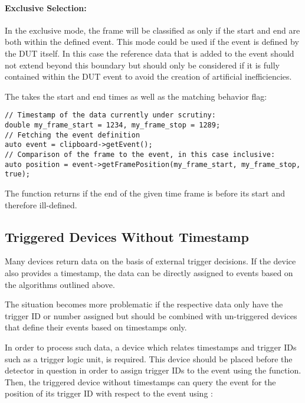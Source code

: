 \paragraph{Exclusive Selection:}
In the exclusive mode, the frame will be classified as  only if the start and end are both within the defined event.
This mode could be used if the event is defined by the DUT itself.
In this case the reference data that is added to the event should not extend beyond this boundary but should only be considered if it is fully contained within the DUT event to avoid the creation of artificial inefficiencies.

The  takes the start and end times as well as the matching behavior flag:

\begin{verbatim}
// Timestamp of the data currently under scrutiny:
double my_frame_start = 1234, my_frame_stop = 1289;
// Fetching the event definition
auto event = clipboard->getEvent();
// Comparison of the frame to the event, in this case inclusive:
auto position = event->getFramePosition(my_frame_start, my_frame_stop, true);
\end{verbatim}

The function returns  if the end of the given time frame is before its start and therefore ill-defined.

\subsection{Triggered Devices Without Timestamp}
\label{sec:triggered_devices}

Many devices return data on the basis of external trigger decisions.
If the device also provides a timestamp, the data can be directly assigned to events based on the algorithms outlined above.

The situation becomes more problematic if the respective data only have the trigger ID or number assigned but should be combined with un-triggered devices that define their events based on timestamps only.

In order to process such data, a device which relates timestamps and trigger IDs such as a trigger logic unit, is required.
This device should be placed before the detector in question in order to assign trigger IDs to the event using the  function.
Then, the triggered device without timestamps can query the event for the position of its trigger ID with respect to the event using :

